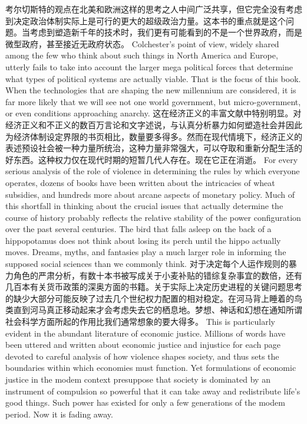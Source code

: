 \begin{paracol}{2}
\switchcolumn*
考尔切斯特的观点在北美和欧洲这样的思考之人中间广泛共享，但它完全没有考虑到决定政治体制实际上是可行的更大的超级政治力量。这本书的重点就是这个问题。当考虑到塑造新千年的技术时，我们更有可能看到的不是一个世界政府，而是微型政府，甚至接近无政府状态。
\switchcolumn
Colchester's point of view, widely shared among the few who think about such things in North America and Europe, utterly fails to take into account the larger mega political forces that determine what types of political systems are actually viable. That is the focus of this book. When the technologies that are shaping the new millennium are considered, it is far more likely that we will see not one world government, but micro-government, or even conditions approaching anarchy.
\switchcolumn*
这在经济正义的丰富文献中特别明显。对经济正义和不正义的数百万言论和文字述说，与认真分析暴力如何塑造社会并因此为经济体制设定界限的书页相比，数量要多得多。然而在现代情境下，经济正义的表述预设社会被一种力量所统治，这种力量非常强大，可以夺取和重新分配生活的好东西。这种权力仅在现代时期的短暂几代人存在。现在它正在消逝。
\switchcolumn
For every serious analysis of the role of violence in determining the rules by which everyone operates, dozens of books have been written about the intricacies of wheat subsidies, and hundreds more about arcane aspects of monetary policy. Much of this shortfall in thinking about the crucial issues that actually determine the course of history probably reflects the relative stability of the power configuration over the past several centuries. The bird that falls asleep on the back of a hippopotamus does not think about losing its perch until the hippo actually moves. Dreams, myths, and fantasies play a much larger role in informing the supposed social sciences than we commonly think. 
\switchcolumn*
对于决定每个人运作规则的暴力角色的严肃分析，有数十本书被写成关于小麦补贴的错综复杂事宜的数倍，还有几百本有关货币政策的深奥方面的书籍。关于实际上决定历史进程的关键问题思考的缺少大部分可能反映了过去几个世纪权力配置的相对稳定。在河马背上睡着的鸟类直到河马真正移动起来才会考虑失去它的栖息地。梦想、神话和幻想在通知所谓社会科学方面所起的作用比我们通常想象的要大得多。
\switchcolumn
This is particularly evident in the abundant literature of economic justice. Millions of words have been uttered and written about economic justice and injustice for each page devoted to careful analysis of how violence shapes society, and thus sets the boundaries within which economies must function. Yet formulations of economic justice in the modem context presuppose that society is dominated by an instrument of compulsion so powerful that it can take away and redistribute life's good things. Such power has existed for only a few generations of the modem period. Now it is fading away. 
\end{paracol}

